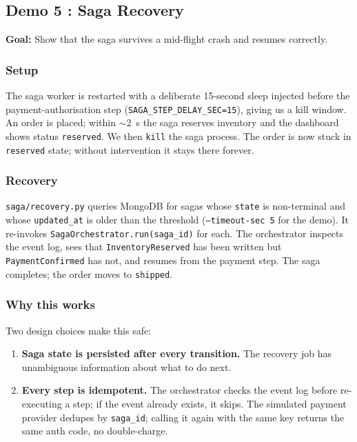 \documentclass[11pt,a4paper]{article}
\newcommand{\code}[1]{\texttt{\small #1}}
\newcommand{\file}[1]{\textcolor{primary}{\texttt{\small #1}}}
\begin{document}

\subsection{Demo 5 : Saga Recovery}\label{sec:demo5}

\textbf{Goal:} Show that the saga survives a mid-flight crash and resumes correctly.

\subsubsection{Setup}

The saga worker is restarted with a deliberate 15-second sleep injected before the payment-authorisation step (\code{SAGA\_STEP\_DELAY\_SEC=15}), giving us a kill window. An order is placed; within $\sim$2~s the saga reserves inventory and the dashboard shows status \code{reserved}. We then \code{kill} the saga process. The order is now stuck in \code{reserved} state; without intervention it stays there forever.

\subsubsection{Recovery}

\file{saga/recovery.py} queries MongoDB for sagas whose \code{state} is non-terminal and whose \code{updated\_at} is older than the threshold (\code{--timeout-sec 5} for the demo). It re-invokes \code{SagaOrchestrator.run(saga\_id)} for each. The orchestrator inspects the event log, sees that \code{InventoryReserved} has been written but \code{PaymentConfirmed} has not, and resumes from the payment step. The saga completes; the order moves to \code{shipped}.

\subsubsection{Why this works}

Two design choices make this safe:

\begin{enumerate}
  \item \textbf{Saga state is persisted after every transition.} The recovery job has unambiguous information about what to do next.
  \item \textbf{Every step is idempotent.} The orchestrator checks the event log before re-executing a step; if the event already exists, it skips. The simulated payment provider dedupes by \code{saga\_id}; calling it again with the same key returns the same auth code, no double-charge.
\end{enumerate}
\end{document}
